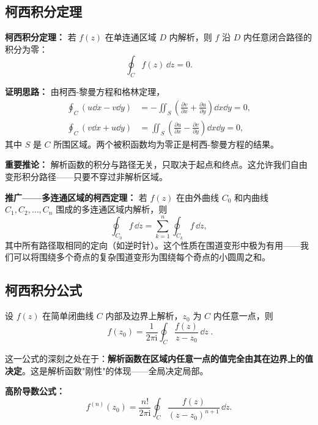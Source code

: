 \subsection{柯西积分定理}

\textbf{柯西积分定理：} 若 $f(z)$ 在单连通区域 $D$ 内解析，则 $f$ 沿 $D$ 内任意闭合路径的积分为零：
\begin{equation}
\oint_C f(z)\,\dd z = 0.
\label{eq:cauchy_integral_theorem}
\end{equation}

\textbf{证明思路：} 由柯西-黎曼方程和格林定理，
\begin{align}
\oint_C (u\dd x - v\dd y) &= -\iint_S \left(\frac{\partial v}{\partial x} + \frac{\partial u}{\partial y}\right)\dd x\dd y = 0,\\
\oint_C (v\dd x + u\dd y) &= \iint_S \left(\frac{\partial u}{\partial x} - \frac{\partial v}{\partial y}\right)\dd x\dd y = 0,
\end{align}
其中 $S$ 是 $C$ 所围区域。两个被积函数均为零正是柯西-黎曼方程的结果。

\textbf{重要推论：} 解析函数的积分与路径无关，只取决于起点和终点。这允许我们自由变形积分路径——只要不穿过非解析区域。

\textbf{推广——多连通区域的柯西定理：} 若 $f(z)$ 在由外曲线 $C_0$ 和内曲线 $C_1,C_2,\dots,C_n$ 围成的多连通区域内解析，则
\begin{equation}
\oint_{C_0} f\,\dd z = \sum_{k=1}^n \oint_{C_k} f\,\dd z,
\end{equation}
其中所有路径取相同的定向（如逆时针）。这个性质在围道变形中极为有用——我们可以将围绕多个奇点的复杂围道变形为围绕每个奇点的小圆周之和。

\subsection{柯西积分公式}

设 $f(z)$ 在简单闭曲线 $C$ 内部及边界上解析，$z_0$ 为 $C$ 内任意一点，则
\begin{equation}
\boxed{\;f(z_0) = \frac{1}{2\pi\mathrm{i}}\oint_C \frac{f(z)}{z - z_0}\,\dd z\;}.
\label{eq:cauchy_integral_formula}
\end{equation}

这一公式的深刻之处在于：\textbf{解析函数在区域内任意一点的值完全由其在边界上的值决定}。这是解析函数"刚性"的体现——全局决定局部。

\textbf{高阶导数公式：}
\begin{equation}
f^{(n)}(z_0) = \frac{n!}{2\pi\mathrm{i}}\oint_C \frac{f(z)}{(z - z_0)^{n+1}}\,\dd z.
\label{eq:cauchy_derivative}
\end{equation}


